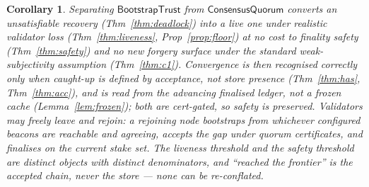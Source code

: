 \documentclass[11pt]{article}
\newtheorem{corollary}[theorem]{Corollary}
\begin{document}
\begin{corollary}
Separating $\mathsf{BootstrapTrust}$ from $\mathsf{ConsensusQuorum}$ converts an
unsatisfiable recovery (Thm~\ref{thm:deadlock}) into a live one under realistic validator
loss (Thm~\ref{thm:liveness}, Prop~\ref{prop:floor}) at no cost to finality safety
(Thm~\ref{thm:safety}) and no new forgery surface under the standard weak-subjectivity
assumption (Thm~\ref{thm:c1}). Convergence is then \emph{recognised} correctly only when
caught-up is defined by acceptance, not store presence (Thm~\ref{thm:has},
Thm~\ref{thm:acc}), and is read from the advancing finalised ledger, not a frozen cache
(Lemma~\ref{lem:frozen}); both are cert-gated, so safety is preserved. Validators may freely
leave and rejoin: a rejoining node bootstraps from whichever configured beacons are reachable
and agreeing, accepts the gap under quorum certificates, and finalises on the current stake set.
The liveness threshold and the safety threshold are distinct objects with distinct denominators,
and ``reached the frontier'' is the accepted chain, never the store --- none can be re-conflated.
\end{corollary}
\end{document}
